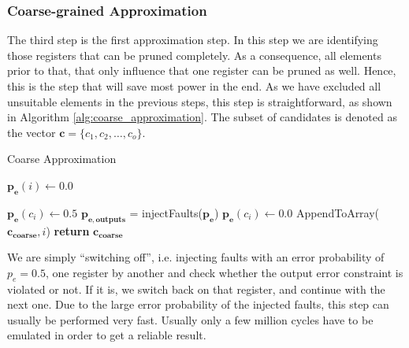 \documentclass[10pt,twocolumn]{IEEEtran} %
\begin{document}
\subsubsection{\bf{Coarse-grained Approximation}}
The third step is the first approximation step. In this step we are identifying those registers that can be pruned completely. As a consequence, all elements prior to that, that only influence that one register can be pruned as well. Hence, this is the step that will save most power in the end. As we have excluded all unsuitable elements in the previous steps, this step is straightforward, as shown in Algorithm \ref{alg:coarse_approximation}. The subset of candidates is denoted as the vector $\mathbf{c} = \{c_1,c_2,\ldots,c_{o}\}$.
\begin{algorithm}[h]
  \caption{Coarse Approximation}\label{alg:coarse_approximation}
  \begin{algorithmic}[1]
    \State $\mathbf{p_e}(i) \gets 0.0$
    \EndFor

    \State $\mathbf{p_e}(c_i) \gets 0.5$
    \State $\mathbf{p_{e,outputs}}$ = injectFaults($\mathbf{p_e}$)
    \State $\mathbf{p_e}(c_i) \gets 0.0$
    \Else
    \State AppendToArray($\mathbf{c_{coarse}},i$)
    \EndIf
    \EndFor
    \State \textbf{return} $\mathbf{c_{coarse}}$ 
    \EndProcedure
  \end{algorithmic}
\end{algorithm}
We are simply ``switching off'', i.e. injecting faults with an error probability of $p_e=0.5$, one register by another and check whether the output error constraint is violated or not. If it is, we switch back on that register, and continue with the next one. Due to the large error probability of the injected faults, this step can usually be performed very fast. Usually only a few million cycles have to be emulated in order to get a reliable result. 
\end{document}
